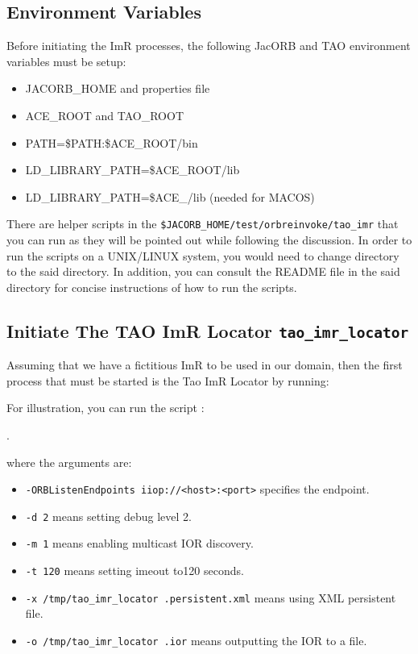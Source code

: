 \subsection{Environment Variables}

Before initiating the ImR processes, the following JacORB and TAO
environment variables must be setup:
\begin{itemize}
   \item JACORB\_HOME and properties file
    \item ACE\_ROOT and TAO\_ROOT
    \item PATH=\$PATH:\$ACE\_ROOT/bin
    \item LD\_LIBRARY\_PATH=\$ACE\_ROOT/lib
    \item LD\_LIBRARY\_PATH=\$ACE_\ROOT/lib (needed for MACOS)
\end{itemize}

There are helper scripts in the {\tt \$JACORB\_HOME/test/orbreinvoke/tao\_imr}
 that you can run as they will be pointed out while following the discussion.
In order to run the scripts on a UNIX/LINUX system, you would need to
change directory to the said directory.  In addition, you can consult the
README file in the said directory for concise instructions of how to
run the scripts.

\subsection{Initiate The TAO ImR Locator {\tt tao\_imr\_locator}}

Assuming that we have a fictitious ImR to be used in our domain, then
the first process that must be started is the Tao ImR Locator by running:


For illustration, you can  run the script :

.

where the arguments are:
\begin{itemize}
    \item {\tt -ORBListenEndpoints iiop://<host>:<port>} specifies the endpoint.
    \item {\tt -d 2} means setting debug level 2.
    \item {\tt -m 1} means enabling multicast IOR discovery.
    \item {\tt -t 120} means setting imeout to120 seconds.
    \item {\tt -x /tmp/tao\_imr\_locator .persistent.xml} means using XML persistent file.
    \item {\tt -o /tmp/tao\_imr\_locator .ior} means outputting the IOR to a file.
\end{itemize}

